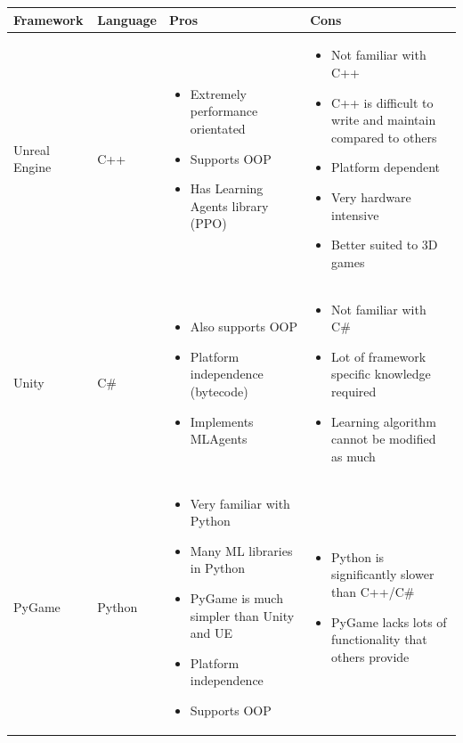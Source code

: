 \begin{longtable}{|p{2.8cm}|p{1.6cm}|p{5cm}|p{5cm}|}
    \hline
    Framework & Language & Pros & Cons\\
    \hline
    \hline
    Unreal Engine & C++ & \begin{itemize}[leftmargin=*, topsep=0pt]
        \item Extremely performance orientated
        \item Supports OOP
        \item Has Learning Agents library (PPO)
    \end{itemize}
     & \begin{itemize}[leftmargin=*, topsep=0pt]
        \item Not familiar with C++
        \item C++ is difficult to write and maintain compared to others
        \item Platform dependent
        \item Very hardware intensive
        \item Better suited to 3D games
    \end{itemize}\\
    \hline
    Unity & C\# & \begin{itemize}[leftmargin=*, topsep=0pt]
        \item Also supports OOP
        \item Platform independence (bytecode)
        \item Implements MLAgents 
    \end{itemize} & \begin{itemize}[leftmargin=*, topsep=0pt]
        \item Not familiar with C\#
        \item Lot of framework specific knowledge required
        \item Learning algorithm cannot be modified as much
    \end{itemize}\\
    \hline
    PyGame & Python & \begin{itemize}[leftmargin=*, topsep=0pt]
        \item Very familiar with Python
        \item Many ML libraries in Python
        \item PyGame is much simpler than Unity and UE
        \item Platform independence
        \item Supports OOP
    \end{itemize} & \begin{itemize}[leftmargin=*, topsep=0pt]
        \item Python is significantly slower than C++/C\#
        \item PyGame lacks lots of functionality that others provide
    \end{itemize}\\
    \hline
\end{longtable}

